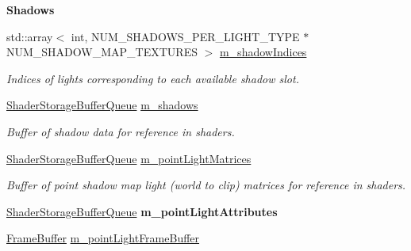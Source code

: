 \begin{Indent}\textbf{ Shadows}\par
\begin{DoxyCompactItemize}
\item 
std\+::array$<$ int, N\+U\+M\+\_\+\+S\+H\+A\+D\+O\+W\+S\+\_\+\+P\+E\+R\+\_\+\+L\+I\+G\+H\+T\+\_\+\+T\+Y\+PE $\ast$N\+U\+M\+\_\+\+S\+H\+A\+D\+O\+W\+\_\+\+M\+A\+P\+\_\+\+T\+E\+X\+T\+U\+R\+ES $>$ \mbox{\hyperlink{classrev_1_1_lighting_settings_aa2e60999ab440042e19efbd3fd5fb8f4}{m\+\_\+shadow\+Indices}}
\begin{DoxyCompactList}\small\item\em Indices of lights corresponding to each available shadow slot. \end{DoxyCompactList}\item 
\mbox{\label{classrev_1_1_lighting_settings_ab5cef2f13b9022411cbd36bf157d5f79}} 
\mbox{\hyperlink{classrev_1_1_buffer_queue}{Shader\+Storage\+Buffer\+Queue}} \mbox{\hyperlink{classrev_1_1_lighting_settings_ab5cef2f13b9022411cbd36bf157d5f79}{m\+\_\+shadows}}
\begin{DoxyCompactList}\small\item\em Buffer of shadow data for reference in shaders. \end{DoxyCompactList}\item 
\mbox{\label{classrev_1_1_lighting_settings_a0dc7b49ef1716a7389577a1f464f133b}} 
\mbox{\hyperlink{classrev_1_1_buffer_queue}{Shader\+Storage\+Buffer\+Queue}} \mbox{\hyperlink{classrev_1_1_lighting_settings_a0dc7b49ef1716a7389577a1f464f133b}{m\+\_\+point\+Light\+Matrices}}
\begin{DoxyCompactList}\small\item\em Buffer of point shadow map light (world to clip) matrices for reference in shaders. \end{DoxyCompactList}\item 
\mbox{\label{classrev_1_1_lighting_settings_a3555466ee12861e99e05c8f00eed260f}} 
\mbox{\hyperlink{classrev_1_1_buffer_queue}{Shader\+Storage\+Buffer\+Queue}} {\bfseries m\+\_\+point\+Light\+Attributes}
\item 
\mbox{\label{classrev_1_1_lighting_settings_a31018b552efdc657a908960bbaf35471}} 
\mbox{\hyperlink{classrev_1_1_frame_buffer}{Frame\+Buffer}} \mbox{\hyperlink{classrev_1_1_lighting_settings_a31018b552efdc657a908960bbaf35471}{m\+\_\+point\+Light\+Frame\+Buffer}}

\end{DoxyCompactItemize}
\end{Indent}
